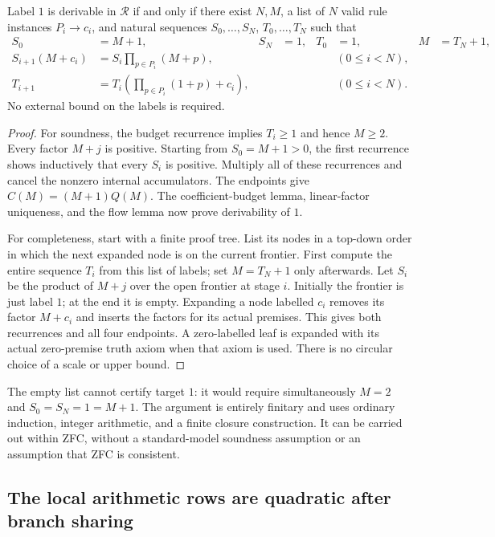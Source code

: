\begin{budgettheorem}
Label $1$ is derivable in $\mathcal R$ if and only if there exist $N,M$,
a list of $N$ valid rule instances $P_i\longrightarrow c_i$, and natural
sequences $S_0,\ldots,S_N$, $T_0,\ldots,T_N$ such that
\begin{align}
 S_0&=M+1, & S_N&=1, & T_0&=1, & M&=T_N+1,                \label{eq:budget-ends}\\
 S_{i+1}(M+c_i)&=S_i\prod_{p\in P_i}(M+p),
 &&&& (0\leq i<N),\nonumber\\
 T_{i+1}&=T_i\left(\prod_{p\in P_i}(1+p)+c_i\right),
 &&&& (0\leq i<N).                                       \label{eq:budget-transitions}
\end{align}
No external bound on the labels is required.
\end{budgettheorem}
\begin{proof}
For soundness, the budget recurrence implies $T_i\geq1$ and hence $M\geq2$.
Every factor $M+j$ is positive.  Starting from $S_0=M+1>0$, the first
recurrence shows inductively that every $S_i$ is positive.  Multiply all
of these recurrences and cancel the nonzero internal accumulators.
The endpoints give
$C(M)=(M+1)Q(M)$.
The coefficient-budget lemma, linear-factor uniqueness, and the flow
lemma now prove derivability of $1$.

For completeness, start with a finite proof tree.  List its nodes in a
top-down order in which the next expanded node is on the current frontier.
First compute the entire sequence $T_i$ from this list of labels; set
$M=T_N+1$ only afterwards.  Let $S_i$ be the product of $M+j$ over the
open frontier at stage $i$.  Initially the frontier is just label $1$;
at the end it is empty.  Expanding a node labelled $c_i$ removes its
factor $M+c_i$ and inserts the factors for its actual premises.  This
gives both recurrences and all four endpoints.  A zero-labelled leaf is
expanded with its actual zero-premise truth axiom when that axiom is used.
There is no circular choice of a scale or upper bound.
\end{proof}

The empty list cannot certify target $1$: it would require simultaneously
$M=2$ and $S_0=S_N=1=M+1$.  The argument is entirely finitary and uses
ordinary induction, integer arithmetic, and a finite closure construction.
It can be carried out within ZFC, without a standard-model soundness
assumption or an assumption that ZFC is consistent.

\subsection{The local arithmetic rows are quadratic after branch sharing}

